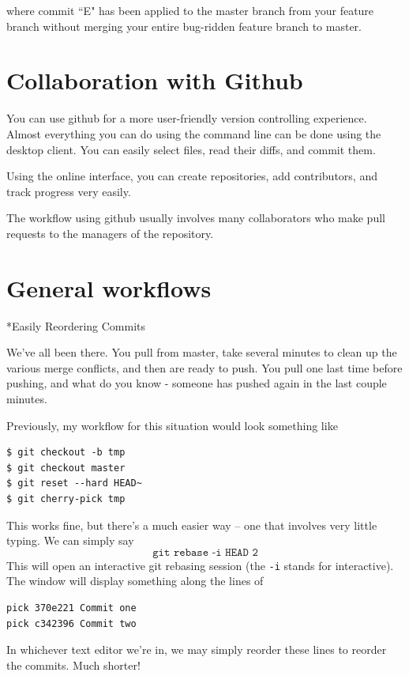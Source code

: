 \documentclass{amsart}
\makeatletter
\renewcommand\subsection{\@startsection{subsection}{2}%
  \z@{-.5\linespacing\@plus-.7\linespacing}{.5\linespacing}%
  {\normalfont\scshape}}
\makeatother
\begin{document}
where commit ``E" has been applied to the master branch from your feature branch without merging your entire bug-ridden feature branch to master.

\newpage
\section*{Collaboration with Github}

You can use github for a more user-friendly version controlling experience.  Almost everything you can do using the command line can be done using the desktop client.  You can easily select files, read their diffs, and commit them.
 

Using the online interface, you can create repositories, add contributors, and track progress very easily.

The workflow using github usually involves many collaborators who make pull requests to the managers of the repository.


\section*{General workflows}

\subsection*{Easily Reordering Commits}

We've all been there. You pull from master, take several minutes to
clean up the various merge conflicts, and then are ready to push. You
pull one last time before pushing, and what do you know - someone has
pushed again in the last couple minutes.

Previously, my workflow for this situation would look something like
\begin{verbatim}
$ git checkout -b tmp
$ git checkout master
$ git reset --hard HEAD~
$ git cherry-pick tmp
\end{verbatim}

This works fine, but there’s a much easier way -- one that involves
very little typing. We can simply say
\[
  \texttt{git rebase -i HEAD~2}
\]
This will open an interactive git rebasing session (the \texttt{-i}
stands for interactive). The window will display something along the
lines of
\begin{verbatim}
pick 370e221 Commit one
pick c342396 Commit two
\end{verbatim}
In whichever text editor we’re in, we may simply reorder these lines
to reorder the commits. Much shorter!
\end{document}
